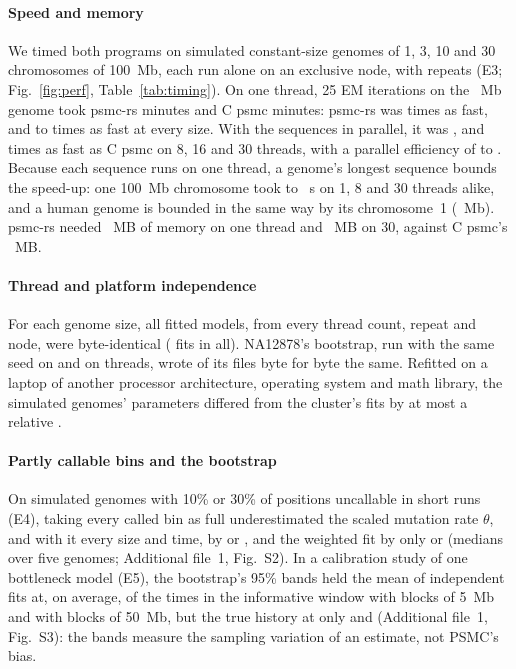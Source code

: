 \documentclass[a4paper,num-refs,gigabyte]{oup-contemporary}%
\newcommand{\psmcrs}{psmc-rs}
\begin{document}
\paragraph{Speed and memory} We timed both programs on simulated constant-size genomes of 1, 3, 10 and 30 chromosomes of 100~Mb, each run alone on an exclusive node, with \EthreeRepeatsW{} repeats (E3; Fig.~\ref{fig:perf}, Table~\ref{tab:timing}). On one thread, 25 EM iterations on the \EthreeBigMb{}~Mb genome took \psmcrs{} \EthreeRsOneMin{} minutes and C psmc \EthreeCMin{} minutes: \psmcrs{} was \EthreeSpeedOne{} times as fast, and \EthreeSpeedOneMin{} to \EthreeSpeedOneMax{} times as fast at every size. With the sequences in parallel, it was \EthreeSpeedEight{}, \EthreeSpeedSixteen{} and \EthreeSpeedThirty{} times as fast as C psmc on 8, 16 and 30 threads, with a parallel efficiency of \EthreeEffMin{} to \EthreeEffMax{}. Because each sequence runs on one thread, a genome's longest sequence bounds the speed-up: one 100~Mb chromosome took \EthreeChromWallMin{} to \EthreeChromWallMax{}~s on 1, 8 and 30 threads alike, and a human genome is bounded in the same way by its chromosome~1 (\EsevenLongestMb{}~Mb). \psmcrs{} needed \EthreeRsMemOne{}~MB of memory on one thread and \EthreeRsMemThirty{}~MB on 30, against C psmc's \EthreeCMem{}~MB.

\paragraph{Thread and platform independence} For each genome size, all fitted models, from every thread count, repeat and node, were byte-identical (\EthreeDetRsTotal{} fits in all). NA12878's bootstrap, run with the same seed on \EtwoBootThreads{} and on \EsevenBootThreads{} threads, wrote \EsevenBootFilesIdentical{} of its \EsevenBootFiles{} files byte for byte the same. Refitted on a laptop of another processor architecture, operating system and math library, the simulated genomes' parameters differed from the cluster's fits by at most a relative \XpParamRelMax{}.

\paragraph{Partly callable bins and the bootstrap} On simulated genomes with 10\% or 30\% of positions uncallable in short runs (E4), taking every called bin as full underestimated the scaled mutation rate $\theta$, and with it every size and time, by \EfourDispTenFqTheta{} or \EfourDispThirtyFqTheta{}, and the weighted fit by only \EfourDispTenAutoTheta{} or \EfourDispThirtyAutoTheta{} (medians over five genomes; Additional file~1, Fig.~S2). In a calibration study of one bottleneck model (E5), the bootstrap's 95\% bands held the mean of independent fits at, on average, \EfiveFiveCovMean{} of the times in the informative window with blocks of 5~Mb and \EfiveFiftyCovMean{} with blocks of 50~Mb, but the true history at only \EfiveFiveCov{} and \EfiveFiftyCov{} (Additional file~1, Fig.~S3): the bands measure the sampling variation of an estimate, not PSMC's bias.
\end{document}
